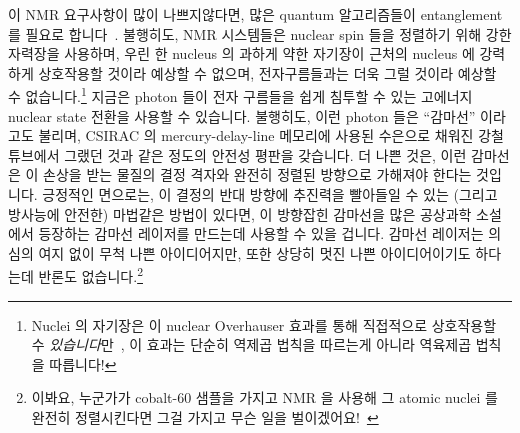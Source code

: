 이 NMR 요구사항이 많이 나쁘지않다면, 많은 quantum 알고리즘들이 entanglement 를
필요로 합니다~\cite{PeterWSchor2001QuantumAlgorithms}.
불행히도, NMR 시스템들은 nuclear spin 들을 정렬하기 위해 강한 자력장을
사용하며, 우린 한 nucleus 의 과하게 약한 자기장이 근처의 nucleus 에 강력하게
상호작용할 것이라 예상할 수 없으며, 전자구름들과는 더욱 그럴 것이라 예상할 수
없습니다.\footnote{
	Nuclei 의 자기장은 이 nuclear Overhauser 효과를 통해 직접적으로
	상호작용할 수 \emph{있습니다}만~\cite{PhysRev.92.411}, 이 효과는 단순히
	역제곱 법칙을 따르는게 아니라 역육제곱 법칙을 따릅니다!}
지금은 photon 들이 전자 구름들을 쉽게 침투할 수 있는 고에너지 nuclear state
전환을 사용할 수 있습니다.
불행히도, 이런 photon 들은 ``감마선'' 이라고도 불리며, CSIRAC 의
mercury-delay-line 메모리에 사용된 수은으로 채워진 강철 튜브에서 그랬던 것과
같은 정도의 안전성 평판을 갖습니다.
더 나쁜 것은, 이런 감마선은 이 손상을 받는 물질의 결정 격자와 완전히 정렬된
방향으로 가해져야 한다는 것입니다.
긍정적인 면으로는, 이 결정의 반대 방향에 추진력을 빨아들일 수 있는 (그리고
방사능에 안전한) 마법같은 방법이 있다면, 이 방향잡힌 감마선을 많은 공상과학
소설에서 등장하는 감마선 레이저를 만드는데 사용할 수 있을 겁니다.
감마선 레이저는 의심의 여지 없이 무척 나쁜 아이디어지만, 또한 상당히 멋진 나쁜
아이디어이기도 하다는데 반론도 없습니다.\footnote{
	이봐요, 누군가가 cobalt-60 샘플을 가지고 NMR 을 사용해 그 atomic nuclei
	를 완전히 정렬시킨다면 그걸 가지고 무슨 일을
	벌이겠어요!~\cite{1957PhRv..105.1413W}}

